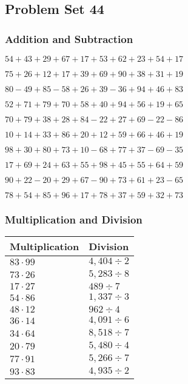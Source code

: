 \hypertarget{problem-set-44}{%
\subsection{Problem Set 44}\label{problem-set-44}}

\hypertarget{addition-and-subtraction}{%
\subsubsection{Addition and
Subtraction}\label{addition-and-subtraction}}

\(54+43+29+67+17+53+62+23+54+17\)

\(75+26+12+17+39+69+90+38+31+19\)

\(80-49+85-58+26+39-36+94+46+83\)

\(52+71+79+70+58+40+94+56+19+65\)

\(70+79+38+28+84-22+27+69-22-86\)

\(10+14+33+86+20+12+59+66+46+19\)

\(98+30+80+73+10-68+77+37-69-35\)

\(17+69+24+63+55+98+45+55+64+59\)

\(90+22-20+29+67-90+73+61+23-65\)

\(78+54+85+96+17+78+37+59+32+73\)

\hypertarget{multiplication-and-division}{%
\subsubsection{Multiplication and
Division}\label{multiplication-and-division}}

\begin{longtable}[]{@{}ll@{}}
\toprule
Multiplication & Division\tabularnewline
\midrule
\endhead
\(83\cdot99\) & \(4,404÷2\)\tabularnewline
\(73\cdot26\) & \(5,283÷8\)\tabularnewline
\(17\cdot27\) & \(489÷7\)\tabularnewline
\(54\cdot86\) & \(1,337÷3\)\tabularnewline
\(48\cdot12\) & \(962÷4\)\tabularnewline
\(36\cdot14\) & \(4,091÷6\)\tabularnewline
\(34\cdot64\) & \(8,518÷7\)\tabularnewline
\(20\cdot79\) & \(5,480÷4\)\tabularnewline
\(77\cdot91\) & \(5,266÷7\)\tabularnewline
\(93\cdot83\) & \(4,935÷2\)\tabularnewline
\bottomrule
\end{longtable}
